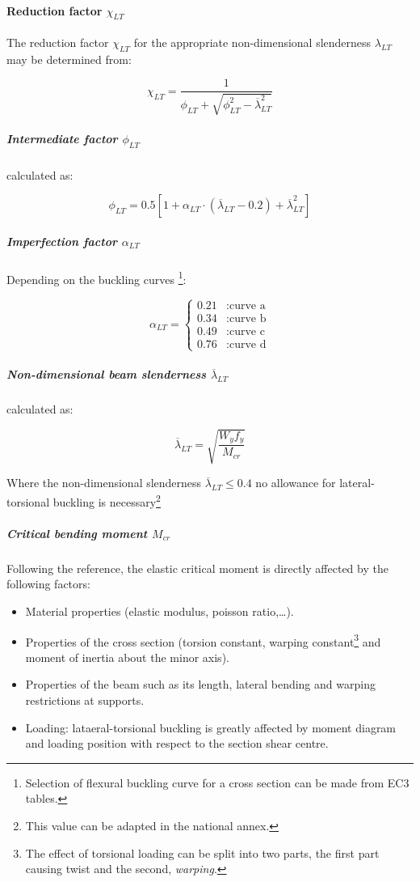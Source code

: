 \paragraph{Reduction factor $\chi_{LT}$}
The reduction factor $\chi_{LT}$ for the appropriate non-dimensional slenderness $\lambda_{LT}$ may be determined from:

\begin{equation}
\chi_{LT}= \frac{1}{\phi_{LT}+\sqrt{\phi_{LT}^2-\overline{\lambda}_{LT}^2}}
\end{equation}

\subparagraph{Intermediate factor $\phi_{LT}$} calculated as:

\begin{equation}
\phi_{LT}= 0.5 [1+\alpha_{LT}\cdot(\overline{\lambda}_{LT}-0.2)+\overline{\lambda}_{LT}^2]
\end{equation}

\subparagraph{Imperfection factor $\alpha_{LT}$}
Depending on the buckling curves \footnote{Selection of flexural buckling curve for a cross section can be made from EC3 tables.}:

\begin{equation}
\alpha_{LT}= \left\{
\begin{array}{lr}
0.21 & : \text{curve a}\\
0.34 & : \text{curve b}\\
0.49 & : \text{curve c}\\
0.76 & : \text{curve d}
\end{array}
\right.
\end{equation}

\subparagraph{Non-dimensional beam slenderness $\overline{\lambda}_{LT}$} calculated as:

\begin{equation}
\overline{\lambda}_{LT}= \sqrt{\frac{W_y f_y}{M_{cr}}}
\end{equation}

Where the non-dimensional slenderness $\overline{\lambda}_{LT} \leq 0.4$ no allowance for lateral-torsional buckling is necessary\footnote{This value can be adapted in the national annex.}

\subparagraph{Critical bending moment $M_{cr}$}
Following the \cite{lopez06} reference, the elastic critical moment is directly affected by the following factors:

\begin{itemize}
\item Material properties (elastic modulus, poisson ratio,\ldots).
\item Properties of the cross section (torsion constant, warping constant\footnote{The effect of torsional loading can be split into two parts, the first part causing twist and the second, \emph{warping}.} and moment of inertia about the minor axis).
\item Properties of the beam such as its length, lateral bending and warping restrictions at supports.
\item Loading: lataeral-torsional buckling is greatly affected by moment diagram and loading position with respect to the section shear centre.
\end{itemize}

